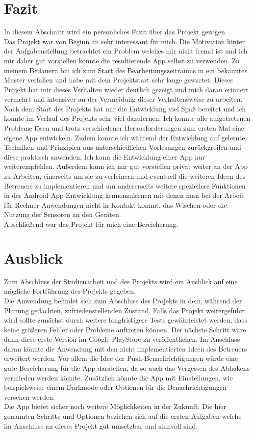 \section{Fazit}\label{sec:fazit}
In diesem Abschnitt wird ein persönliches Fazit über das Projekt gezogen.\\
Das Projekt war von Beginn an sehr interessant für mich. Die Motivation hinter der Aufgabenstellung betrachtet ein Problem welches mir nicht fremd ist und ich mir daher gut vorstellen konnte die resultierende App selbst zu verwenden. Zu meinem Bedauern bin ich zum Start des Bearbeitungszeitraums in ein bekanntes Muster verfallen und habe mit dem Projektstart sehr lange gewartet. Dieses Projekt hat mir dieses Verhalten wieder deutlich gezeigt und mich daran erinnert vermehrt und intensiver an der Vermeidung dieser Verhaltensweise zu arbeiten. Nach dem Start des Projekts hat mir die Entwicklung viel Spaß bereitet und ich konnte im Verlauf des Projekts sehr viel dazulernen. Ich konnte alle aufgetretenen Probleme lösen und trotz verschiedener Herausforderungen zum ersten Mal eine eigene App entwickeln. Zudem konnte ich während der Entwicklung auf gelernte Techniken und Prinzipien aus unterschiedlichen Vorlesungen zurückgreifen und diese praktisch anwenden. Ich kann die Entwicklung einer App nur weiterempfehlen. Außerdem kann ich mir gut vorstellen privat weiter an der App zu Arbeiten, einerseits um sie zu verfeinern und eventuell die weiteren Ideen des Betreuers zu implementieren und um andererseits weitere speziellere Funktionen in der Android App Entwicklung kennenzulernen mit denen man bei der Arbeit für Rechner Anwendungen nicht in Kontakt kommt, \zB das Wischen oder die Nutzung der Sensoren an den Geräten.\\
Abschließend war das Projekt für mich eine Bereicherung.

\section{Ausblick}\label{sec:Ausblick}
Zum Abschluss der Studienarbeit und des Projekts wird ein Ausblick auf eine mögliche Fortführung des Projekts gegeben.\\
Die Anwendung befindet sich zum Abschluss des Projekts in dem, während der Planung gedachten, zufriedenstellenden Zustand. Falls das Projekt weitergeführt wird sollte zunächst durch weitere langfristigere Tests gewährleistet werden, dass keine größeren Fehler oder Probleme auftreten können. Der nächste Schritt wäre dann diese erste Version im Google PlayStore zu veröffentlichen. Im Anschluss daran könnte die Anwendung mit den nicht implementierten Ideen des Betreuers erweitert werden. Vor allem die Idee der Push-Benachrichtigungen würde eine gute Bereicherung für die App darstellen, da so auch das Vergessen des Abhakens vermieden werden könnte. Zusätzlich könnte die App mit Einstellungen, wie beispielsweise einem Darkmode oder Optionen für die Benachrichtigungen versehen werden.\\
Die App bietet sicher noch weitere Möglichkeiten in der Zukunft. Die hier genannten Schritte und Optionen beziehen sich auf die ersten Aufgaben welche im Anschluss an dieses Projekt gut umsetzbar und sinnvoll sind.
